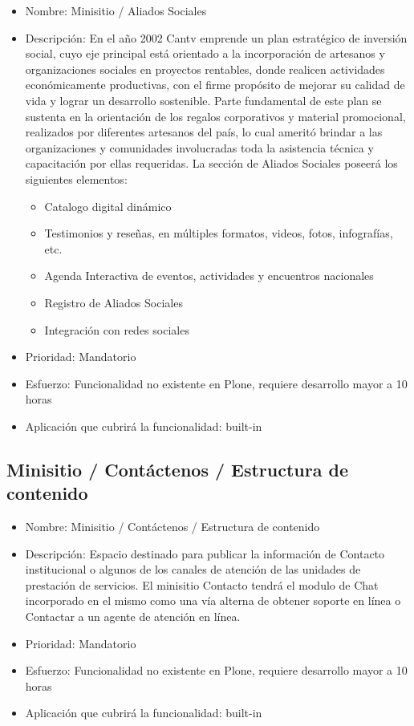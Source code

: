 \documentclass[11pt, letterpaper, oneside, spanish]{scrbook}
\begin{document}
\begin{itemize}
\item Nombre: Minisitio / Aliados Sociales
\item Descripción: En el año 2002 Cantv emprende un plan estratégico de inversión
  social, cuyo eje principal está orientado a la incorporación de artesanos y
  organizaciones sociales en proyectos rentables, donde realicen actividades
  económicamente productivas, con el firme propósito de mejorar su calidad de
  vida y lograr un desarrollo sostenible. Parte fundamental de este plan se
  sustenta en la orientación de los regalos corporativos y material
  promocional, realizados por diferentes artesanos del país, lo cual ameritó
  brindar a las organizaciones y comunidades involucradas toda la asistencia
  técnica y capacitación por ellas requeridas. La sección de Aliados Sociales
  poseerá los siguientes elementos:
\begin{itemize}
\item Catalogo digital dinámico
\item Testimonios y reseñas, en múltiples formatos, videos, fotos, infografías, etc.
\item Agenda Interactiva de eventos, actividades y encuentros nacionales
\item Registro de Aliados Sociales
\item Integración con redes sociales
\end{itemize}
\item Prioridad: Mandatorio
\item Esfuerzo: Funcionalidad no existente en Plone, requiere desarrollo mayor a
  10 horas
\item Aplicación que cubrirá la funcionalidad:  built-in
\end{itemize}
\subsection{Minisitio / Contáctenos / Estructura de contenido}
\label{sec-2-1-35}

\begin{itemize}
\item Nombre: Minisitio / Contáctenos / Estructura de contenido
\item Descripción: Espacio destinado para publicar la información de Contacto
  institucional o algunos de los canales de atención de las unidades de
  prestación de servicios. El minisitio Contacto tendrá el modulo de Chat
  incorporado en el mismo como una vía alterna de obtener soporte en línea o
  Contactar a un agente de atención en línea.
\item Prioridad: Mandatorio
\item Esfuerzo: Funcionalidad no existente en Plone, requiere desarrollo mayor a 10 horas
\item Aplicación que cubrirá la funcionalidad:  built-in
\end{itemize}
\end{document}
